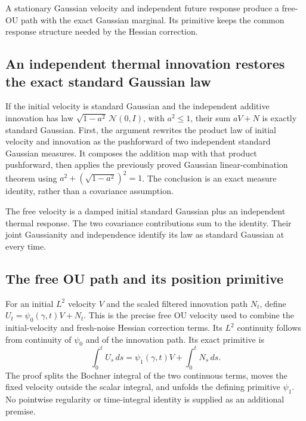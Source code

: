 \documentclass[11pt,a4paper]{report}
\begin{document}
A stationary Gaussian velocity and independent future response produce a free-OU path with the exact Gaussian marginal. Its primitive keeps the common response structure needed by the Hessian correction.

\subsection{\texorpdfstring{An independent thermal innovation restores the exact standard Gaussian law}{An independent thermal innovation restores the exact standard Gaussian law}}
\label{report-step-KineticLangevin-FreeOU-lean-1}


If the initial velocity is standard Gaussian and the independent additive innovation has law \(\sqrt{1-a^2}\,\mathcal N(0,I)\), with \(a^2\le1\), their sum \(aV+N\) is exactly standard Gaussian. First, the argument rewrites the product law of initial velocity and innovation as the pushforward of two independent standard Gaussian measures. It composes the addition map with that product pushforward, then applies the previously proved Gaussian linear-combination theorem using \(a^2+(\sqrt{1-a^2})^2=1\). The conclusion is an exact measure identity, rather than a covariance assumption.



The free velocity is a damped initial standard Gaussian plus an independent thermal response. The two covariance contributions sum to the identity. Their joint Gaussianity and independence identify its law as standard Gaussian at every time.

\subsection{\texorpdfstring{The free OU path and its position primitive}{The free OU path and its position primitive}}
\label{report-step-KineticLangevin-FreeOU-lean-2}


For an initial \(L^{2}\) velocity \(V\) and the scaled filtered innovation path \(N_t\), define \(U_t=\psi_0(\gamma,t)V+N_t\). This is the precise free OU velocity used to combine the initial-velocity and fresh-noise Hessian correction terms. Its \(L^{2}\) continuity follows from continuity of \(\psi_0\) and of the innovation path. Its exact primitive is \[\int_0^tU_s\,ds=\psi_1(\gamma,t)V+\int_0^tN_s\,ds.\] The proof splits the Bochner integral of the two continuous terms, moves the fixed velocity outside the scalar integral, and unfolds the defining primitive \(\psi_1\). No pointwise regularity or time-integral identity is supplied as an additional premise.
\end{document}
